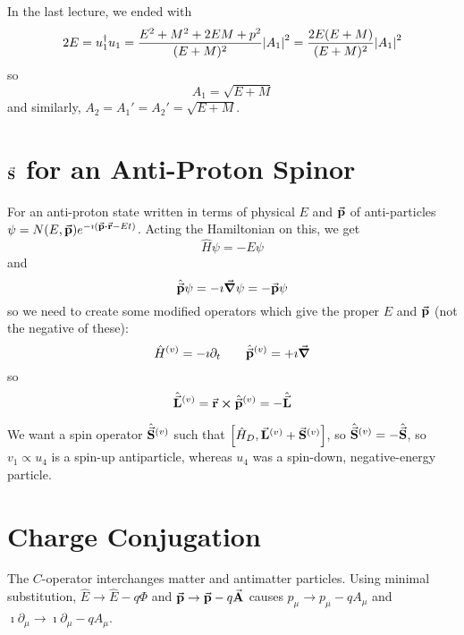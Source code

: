 \documentclass[a4paper,twoside,master.tex]{subfiles}
\begin{document}

In the last lecture, we ended with
\begin{equation}
    2 E = u_1^\dagger u_1 = \frac{E^2 + M^2 + 2 E M + p^2}{(E + M)^2} \abs{A_1}^2 = \frac{2E (E + M)}{(E + M)^2} \abs{A_1}^2
\end{equation}
so
\begin{equation}
    A_1 = \sqrt{E + M}
\end{equation}
and similarly, $ A_2 = A_1' = A_2' = \sqrt{E + M} $.

\section{$ \va{S} $ for an Anti-Proton Spinor}\label{sec:s_for_an_anti-proton_spinor}

For an anti-proton state written in terms of physical $ E $ and $ \va{p} $ of anti-particles $ \psi = N(E, \va{p}) e^{- \imath(\va{p} \vdot \va{r} - E t)} $. Acting the Hamiltonian on this, we get
\begin{equation}
    \hat{H} \psi = - E \psi
\end{equation}
and
\begin{equation}
    \hat{\va{p}} \psi = - \imath \grad{\psi} = - \va{p} \psi
\end{equation}
so we need to create some modified operators which give the proper $ E $ and $ \va{p} $ (not the negative of these):
\begin{equation}
    \hat{H}^{(v)} = - \imath \partial_t \qquad \hat{\va{p}}^{(v)} = + \imath \grad
\end{equation}
so
\begin{equation}
    \hat{\va{L}}^{(v)} = \va{r} \cross \hat{\va{p}}^{(v)} = - \hat{\va{L}}
\end{equation}

We want a spin operator $ \hat{\va{S}}^{(v)} $ such that $ \comm{\hat{H}_D}{\va{L}^{(v)} + \va{S}^{(v)}} $, so $ \hat{\va{S}}^{(v)} = - \hat{\va{S}} $, so $ v_1 \propto u_4 $ is a spin-up antiparticle, whereas $ u_4 $ was a spin-down, negative-energy particle.

\section{Charge Conjugation}\label{sec:charge_conjugation}

The $ C $-operator interchanges matter and antimatter particles. Using minimal substitution, $ \hat{E} \to \hat{E} - q \Phi $ and $ \va{p} \to \va{p} - q \va{A} $ causes $ p_{\mu} \to p_{\mu} - q A_{\mu} $ and $ \imath \partial_{\mu} \to \imath \partial_{\mu} - q A_{\mu} $.
\end{document}

